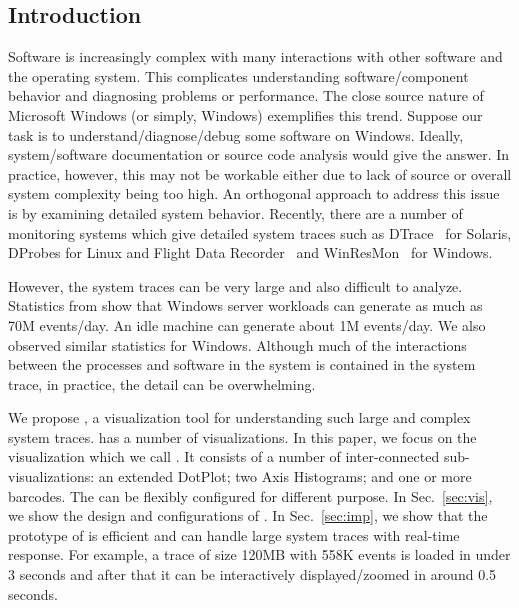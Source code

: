 \subsection{Introduction}

Software is increasingly complex with many interactions with other software
and the operating system.
This complicates understanding software/component behavior and diagnosing
problems or performance.
The close source nature of Microsoft Windows (or simply, Windows) exemplifies this trend.
Suppose our task is to understand/diagnose/debug some software on Windows.
Ideally, system/software documentation or source code
analysis would give the answer.
In practice, however, this may not be
workable either due to lack of source or overall
system complexity being too high.
An orthogonal approach to address this issue is by examining
detailed system behavior.
Recently, there are a number of monitoring systems which
give detailed system traces such as DTrace~\cite{dtrace} for Solaris,
DProbes for Linux and Flight Data Recorder~\cite{fdr}
and WinResMon~\cite{winresmon} for Windows.

However, the system traces can be very large and also
difficult to analyze. Statistics from \cite{fdr} show that Windows
server workloads can generate as much as 70M events/day.
An idle machine can generate about 1M events/day. We also
observed similar statistics for Windows. Although much of
the interactions between the processes and software in the
system is contained in the system trace, in practice, the detail
can be overwhelming.


We propose \lviz{}, a visualization tool for
understanding such large and complex system traces.
\lviz{} has a number of visualizations.
In this paper, we focus on the visualization which we call \VDP{}.
It consists of a number of inter-connected sub-visualizations:
an extended DotPlot;
two Axis Histograms; and one or more barcodes.
The \VDP{} can be flexibly configured for different purpose.
In Sec.~\ref{sec:vis}, we show the design and configurations of \VDP{}.
In Sec.~\ref{sec:imp}, we show that
the prototype of \lviz{} is efficient and can handle large system traces
with real-time response. For example, a trace of size 120MB with 558K events 
is loaded in under 3 seconds
and after that it can be interactively displayed/zoomed in around 0.5 seconds.

